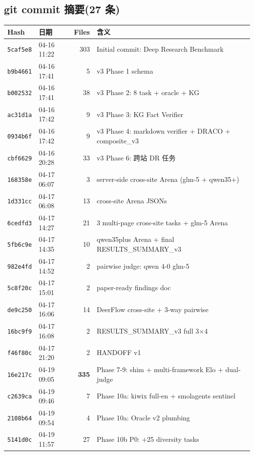 \documentclass[UTF8,11pt]{ctexart}
\begin{document}
\subsection{git commit 摘要(27 条)}

\begin{center}
\scriptsize
\begin{tabular}{@{}llrp{7.8cm}@{}}
\toprule
\textbf{Hash} & \textbf{日期} & \textbf{Files} & \textbf{含义} \\
\midrule
\texttt{5caf5e8} & 04-16 11:22 & 303 & Initial commit: Deep Research Benchmark \\
\texttt{b9b4661} & 04-16 17:41 & 5 & v3 Phase 1 schema \\
\texttt{b002532} & 04-16 17:41 & 38 & v3 Phase 2: 8 task + oracle + KG \\
\texttt{ac31d1a} & 04-16 17:42 & 9 & v3 Phase 3: KG Fact Verifier \\
\texttt{0934b6f} & 04-16 17:42 & 9 & v3 Phase 4: markdown verifier + DRACO + composite\_v3 \\
\texttt{cbf6629} & 04-16 20:28 & 33 & v3 Phase 6: 跨站 DR 任务 \\
\texttt{168358e} & 04-17 06:07 & 3 & server-side cross-site Arena (glm-5 + qwen35+) \\
\texttt{1d331cc} & 04-17 06:08 & 13 & cross-site Arena JSONs \\
\texttt{6cedfd3} & 04-17 14:27 & 21 & 3 multi-page cross-site tasks + glm-5 Arena \\
\texttt{5fb6c9e} & 04-17 14:35 & 10 & qwen35plus Arena + final RESULTS\_SUMMARY\_v3 \\
\texttt{982e4fd} & 04-17 14:52 & 2 & pairwise judge: qwen 4-0 glm-5 \\
\texttt{5c8f20c} & 04-17 15:01 & 2 & paper-ready findings doc \\
\texttt{de9c250} & 04-17 16:06 & 14 & DeerFlow cross-site + 3-way pairwise \\
\texttt{16bc9f9} & 04-17 16:08 & 2 & RESULTS\_SUMMARY\_v3 full 3$\times$4 \\
\texttt{f46f80c} & 04-17 21:20 & 2 & HANDOFF v1 \\
\texttt{16e217c} & 04-19 09:05 & \textbf{335} & Phase 7-9: shim + multi-framework Elo + dual-judge \\
\texttt{c2639ca} & 04-19 09:46 & 7 & Phase 10a: kiwix full-en + smolagents sentinel \\
\texttt{2108b64} & 04-19 09:54 & 4 & Phase 10a: Oracle v2 plumbing \\
\texttt{5141d0c} & 04-19 11:57 & 27 & Phase 10b P0: +25 diversity tasks \\

\end{tabular}
\end{center}
\end{document}

